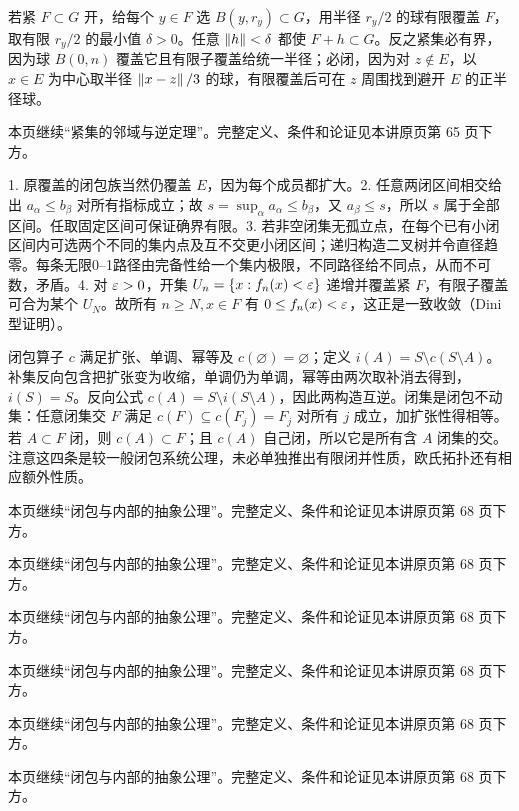 若紧 $F\subset G$ 开，给每个 $y\in F$ 选 $B(y,r_y)\subset G$，用半径 $r_y/2$ 的球有限覆盖 $F$，取有限 $r_y/2$ 的最小值 $\delta>0$。任意 $\left\lVert h\right\rVert<\delta$ 都使 $F+h\subset G$。反之紧集必有界，因为球 $B(0,n)$ 覆盖它且有限子覆盖给统一半径；必闭，因为对 $z\notin E$，以 $x\in E$ 为中心取半径 $\left\lVert x-z\right\rVert/3$ 的球，有限覆盖后可在 $z$ 周围找到避开 $E$ 的正半径球。

本页继续“紧集的邻域与逆定理”。完整定义、条件和论证见本讲原页第 65 页下方。

1. 原覆盖的闭包族当然仍覆盖 $E$，因为每个成员都扩大。2. 任意两闭区间相交给出 $a_\alpha\le b_\beta$ 对所有指标成立；故 $s=\sup_\alpha a_\alpha\le b_\beta$，又 $a_\beta\le s$，所以 $s$ 属于全部区间。任取固定区间可保证确界有限。3. 若非空闭集无孤立点，在每个已有小闭区间内可选两个不同的集内点及互不交更小闭区间；递归构造二叉树并令直径趋零。每条无限0--1路径由完备性给一个集内极限，不同路径给不同点，从而不可数，矛盾。4. 对 $\varepsilon>0$，开集 $U_n=\{x:f_n(x)<\varepsilon\}$ 递增并覆盖紧 $F$，有限子覆盖可合为某个 $U_N$。故所有 $n\ge N,x\in F$ 有 $0\le f_n(x)<\varepsilon$，这正是一致收敛（Dini 型证明）。

闭包算子 $c$ 满足扩张、单调、幂等及 $c(\varnothing)=\varnothing$；定义 $i(A)=S\setminus c(S\setminus A)$。补集反向包含把扩张变为收缩，单调仍为单调，幂等由两次取补消去得到，$i(S)=S$。反向公式 $c(A)=S\setminus i(S\setminus A)$，因此两构造互逆。闭集是闭包不动集：任意闭集交 $F$ 满足 $c(F)\subseteq c(F_j)=F_j$ 对所有 $j$ 成立，加扩张性得相等。若 $A\subset F$ 闭，则 $c(A)\subset F$；且 $c(A)$ 自己闭，所以它是所有含 $A$ 闭集的交。注意这四条是较一般闭包系统公理，未必单独推出有限闭并性质，欧氏拓扑还有相应额外性质。

本页继续“闭包与内部的抽象公理”。完整定义、条件和论证见本讲原页第 68 页下方。

本页继续“闭包与内部的抽象公理”。完整定义、条件和论证见本讲原页第 68 页下方。

本页继续“闭包与内部的抽象公理”。完整定义、条件和论证见本讲原页第 68 页下方。

本页继续“闭包与内部的抽象公理”。完整定义、条件和论证见本讲原页第 68 页下方。

本页继续“闭包与内部的抽象公理”。完整定义、条件和论证见本讲原页第 68 页下方。

本页继续“闭包与内部的抽象公理”。完整定义、条件和论证见本讲原页第 68 页下方。

